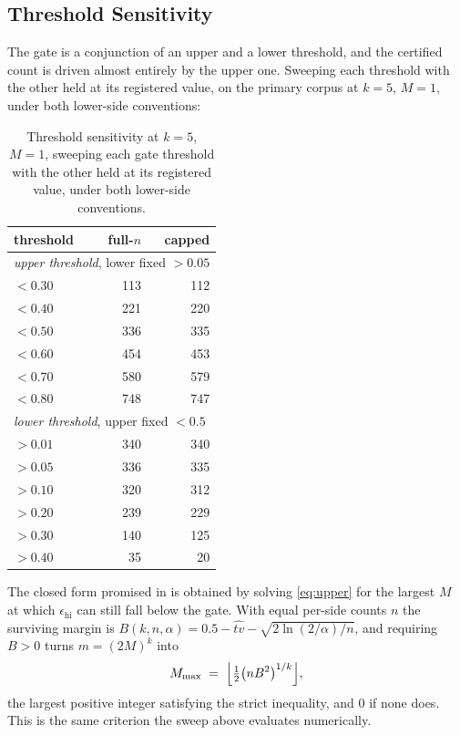 \documentclass[sigconf,anonymous,review]{acmart}
\newcommand{\epshi}{\ensuremath{\epsilon_{\mathrm{hi}}}}
\begin{document}
\subsection{Threshold Sensitivity}
\label{sec:appendix/thresholds}

The gate is a conjunction of an upper and a lower threshold, and the certified
count is driven almost entirely by the upper one. Sweeping each threshold with
the other held at its registered value, on the primary corpus at $k{=}5$,
$M{=}1$, under both lower-side conventions:

\begin{table}[t]
\centering
\small
\caption{Threshold sensitivity at $k{=}5$, $M{=}1$, sweeping each gate threshold with the other held at its registered value, under both lower-side conventions.}
\label{tab:thresholds}
\begin{tabular}{lrr}
\toprule
threshold & full-$n$ & capped \\
\midrule
\multicolumn{3}{l}{\emph{upper threshold}, lower fixed $>0.05$} \\
$<0.30$ & 113 & 112 \\
$<0.40$ & 221 & 220 \\
$<0.50$ & 336 & 335 \\
$<0.60$ & 454 & 453 \\
$<0.70$ & 580 & 579 \\
$<0.80$ & 748 & 747 \\
\midrule
\multicolumn{3}{l}{\emph{lower threshold}, upper fixed $<0.5$} \\
$>0.01$ & 340 & 340 \\
$>0.05$ & 336 & 335 \\
$>0.10$ & 320 & 312 \\
$>0.20$ & 239 & 229 \\
$>0.30$ & 140 & 125 \\
$>0.40$ & 35 & 20 \\
\bottomrule
\end{tabular}
\end{table}

The closed form promised in  is obtained by solving
\eqref{eq:upper} for the largest $M$ at which $\epshi$ can still fall below the
gate. With equal per-side counts $n$ the surviving margin is
$B(k,n,\alpha) = 0.5 - \widehat{tv} - \sqrt{2\ln(2/\alpha)/n}$, and requiring
$B>0$ turns $m=(2M)^k$ into
\begin{equation}
  M_{\max} \;=\; \Bigl\lfloor \tfrac{1}{2}\bigl(nB^{2}\bigr)^{1/k} \Bigr\rfloor ,
  \label{eq:mmax}
\end{equation}
the largest positive integer satisfying the strict inequality, and $0$ if none
does. This is the same criterion the sweep above evaluates numerically.
\end{document}
